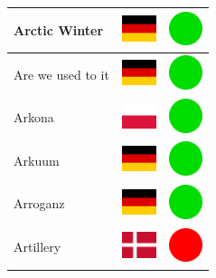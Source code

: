 \documentclass[12pt, a4paper, twoside]{report}
\begin{document}
\begin{center}
\begin{longtable}{|p{5cm}|p{2cm}|p{2cm}|}
 Arctic Winter                                              & \includegraphics[width=1cm]{../img/flags/de} &   \includegraphics[width=1cm]{../likes/y} \\ \hline
 Are we used to it                                          & \includegraphics[width=1cm]{../img/flags/de} &   \includegraphics[width=1cm]{../likes/y} \\ \hline
 Arkona                                                     & \includegraphics[width=1cm]{../img/flags/pl} &   \includegraphics[width=1cm]{../likes/y} \\ \hline
 Arkuum                                                     & \includegraphics[width=1cm]{../img/flags/de} &   \includegraphics[width=1cm]{../likes/y} \\ \hline
 Arroganz                                                   & \includegraphics[width=1cm]{../img/flags/de} &   \includegraphics[width=1cm]{../likes/y} \\ \hline
 Artillery                                                  & \includegraphics[width=1cm]{../img/flags/dk} &   \includegraphics[width=1cm]{../likes/n} \\ \hline

\end{longtable}
\end{center}
\end{document}
